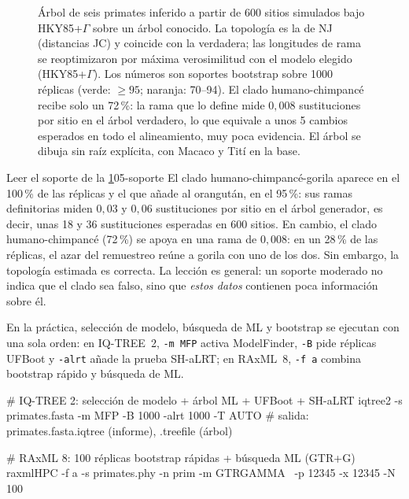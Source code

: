 \begin{figure}[t]
\centering

\caption[Árbol con soporte bootstrap]{Árbol de seis primates inferido a partir de 600 sitios simulados bajo HKY85+$\Gamma$ sobre un árbol conocido. La topología es la de NJ (distancias JC) y coincide con la verdadera; las longitudes de rama se reoptimizaron por máxima verosimilitud con el modelo elegido (HKY85+$\Gamma$). Los números son soportes bootstrap sobre \num{1000} réplicas (verde: $\ge95$; naranja: 70–94). El clado humano-chimpancé recibe solo un 72\,\%: la rama que lo define mide $0{,}008$ sustituciones por sitio en el árbol verdadero, lo que equivale a unos 5 cambios esperados en todo el alineamiento, muy poca evidencia. El árbol se dibuja sin raíz explícita, con Macaco y Tití en la base.}
\label{fig:05-bootstrap}
\end{figure}

\begin{ejemplo}{Leer el soporte de la \cref{fig:05-bootstrap}}{05-soporte}
El clado humano-chimpancé-gorila aparece en el 100\,\% de las réplicas y el que añade al orangután, en el 95\,\%: sus ramas definitorias miden $0{,}03$ y $0{,}06$ sustituciones por sitio en el árbol generador, es decir, unas 18 y 36 sustituciones esperadas en 600 sitios. En cambio, el clado humano-chimpancé (72\,\%) se apoya en una rama de $0{,}008$: en un 28\,\% de las réplicas, el azar del remuestreo reúne a gorila con uno de los dos. Sin embargo, la topología estimada es correcta. La lección es general: un soporte moderado no indica que el clado sea falso, sino que \emph{estos datos} contienen poca información sobre él.
\end{ejemplo}

En la práctica, selección de modelo, búsqueda de ML y bootstrap se ejecutan con una sola orden: en IQ-TREE~2, \texttt{-m MFP} activa ModelFinder, \texttt{-B} pide réplicas UFBoot y \texttt{-alrt} añade la prueba SH-aLRT; en RAxML~8, \texttt{-f a} combina bootstrap rápido y búsqueda de ML.

\begin{consola}
# IQ-TREE 2: selección de modelo + árbol ML + UFBoot + SH-aLRT
iqtree2 -s primates.fasta -m MFP -B 1000 -alrt 1000 -T AUTO
# salida: primates.fasta.iqtree (informe), .treefile (árbol)

# RAxML 8: 100 réplicas bootstrap rápidas + búsqueda ML (GTR+G)
raxmlHPC -f a -s primates.phy -n prim -m GTRGAMMA \
         -p 12345 -x 12345 -N 100
\end{consola}

